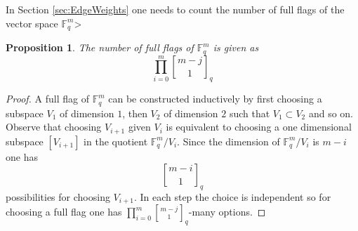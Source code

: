 \documentclass[11pt]{amsart}
\newtheorem{proposition}[theorem]{Proposition}
\newcommand{\gBinom}{\genfrac{[}{]}{0pt}{}}
\begin{document}
	In Section \ref{sec:EdgeWeights} one needs to count the number of full flags of the vector space $\mathbb{F}_q^m$> 
	\begin{proposition}
		The number of full flags of $\mathbb{F}_q^m$ is given as
		\begin{equation}
			\prod_{i=0}^{m}\gBinom{m-j}{1}_q
		\end{equation}
		\label{prop:FullFlags}
	\end{proposition}
	\begin{proof}
		A full flag of $\mathbb{F}_q^m$ can be constructed inductively by first choosing a subspace $V_1$ of dimension $1$, then $V_2$ of dimension $2$ such that $V_1\subset V_2$ and so on. Observe that choosing $V_{i+1}$ given $V_i$ is equivalent to choosing a one dimensional subspace $[V_{i+1}]$ in the quotient $\mathbb{F}_q^m/V_i$. Since the dimension of $\mathbb{F}_q^m/V_i$ is $m-i$ one has 
        \begin{equation}
            \gBinom{m-i}{1}_q
        \end{equation}
        possibilities for choosing $V_{i+1}$. In each step the choice is independent so for choosing a full flag one has $\prod_{i=0}^{m}\gBinom{m-j}{1}_q$-many options. 
	\end{proof}
    \newpage
	
	
\end{document}
